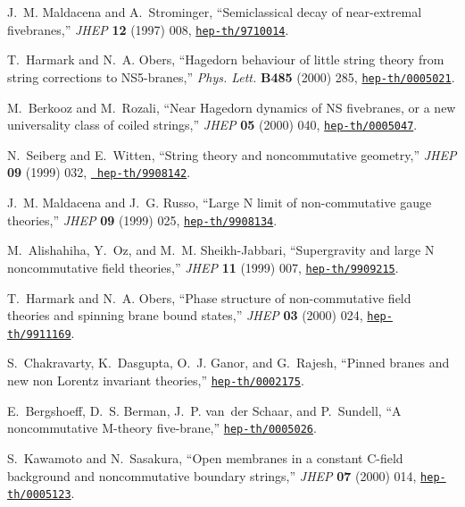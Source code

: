 \documentclass[a4paper,twoside,titlepage,12pt]{article}
\begin{document}
\begin{thebibliography}{10}
J.~M. Maldacena and A.~Strominger, ``Semiclassical decay of near-extremal
  fivebranes,'' {\em JHEP} {\bf 12} (1997) 008,
  \href{http://xxx.lanl.gov/abs/hep-th/9710014}{{\tt hep-th/9710014}}.

T.~Harmark and N.~A. Obers, ``Hagedorn behaviour of little string theory from
  string corrections to {NS5-branes},'' {\em Phys. Lett.} {\bf B485} (2000)
  285, \href{http://xxx.lanl.gov/abs/hep-th/0005021}{{\tt hep-th/0005021}}.

M.~Berkooz and M.~Rozali, ``Near {Hagedorn} dynamics of {NS} fivebranes, or a
  new universality class of coiled strings,'' {\em JHEP} {\bf 05} (2000) 040,
  \href{http://xxx.lanl.gov/abs/hep-th/0005047}{{\tt hep-th/0005047}}.

N.~Seiberg and E.~Witten, ``String theory and noncommutative geometry,'' {\em
  JHEP} {\bf 09} (1999) 032, \href{http://xxx.lanl.gov/abs/hep-th/9908142}{{\tt
  hep-th/9908142}}.

J.~M. Maldacena and J.~G. Russo, ``Large {N} limit of non-commutative gauge
  theories,'' {\em JHEP} {\bf 09} (1999) 025,
  \href{http://xxx.lanl.gov/abs/hep-th/9908134}{{\tt hep-th/9908134}}.

M.~Alishahiha, Y.~Oz, and M.~M. Sheikh-Jabbari, ``Supergravity and large {N}
  noncommutative field theories,'' {\em JHEP} {\bf 11} (1999) 007,
  \href{http://xxx.lanl.gov/abs/hep-th/9909215}{{\tt hep-th/9909215}}.

T.~Harmark and N.~A. Obers, ``Phase structure of non-commutative field theories
  and spinning brane bound states,'' {\em JHEP} {\bf 03} (2000) 024,
  \href{http://xxx.lanl.gov/abs/hep-th/9911169}{{\tt hep-th/9911169}}.

S.~Chakravarty, K.~Dasgupta, O.~J. Ganor, and G.~Rajesh, ``Pinned branes and
  new non {Lorentz} invariant theories,''
  \href{http://xxx.lanl.gov/abs/hep-th/0002175}{{\tt hep-th/0002175}}.

E.~Bergshoeff, D.~S. Berman, J.~P. van~der Schaar, and P.~Sundell, ``A
  noncommutative {M-theory} five-brane,''
  \href{http://xxx.lanl.gov/abs/hep-th/0005026}{{\tt hep-th/0005026}}.

S.~Kawamoto and N.~Sasakura, ``Open membranes in a constant {C-field}
  background and noncommutative boundary strings,'' {\em JHEP} {\bf 07} (2000)
  014, \href{http://xxx.lanl.gov/abs/hep-th/0005123}{{\tt hep-th/0005123}}.


\end{thebibliography}
\end{document}
